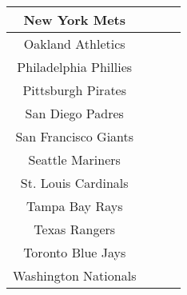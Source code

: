 \documentclass[12pt]{book}
\begin{document}
\begin{center}
\begin{tabular}{|c|c|c|c|}
					\hline
					New York Mets	& & &	\\
					\hline
					Oakland Athletics	& & &	\\
					\hline
					Philadelphia Phillies	& & &	\\
					\hline
					Pittsburgh Pirates	& & &	\\
					\hline
					San Diego Padres	& & &	\\
					\hline
					San Francisco Giants	& & &	\\
					\hline
					Seattle Mariners	& & &	\\
					\hline
					St. Louis Cardinals	& & &	\\
					\hline
					Tampa Bay Rays	& & &	\\
					\hline
					Texas Rangers	& & &	\\
					\hline
					Toronto Blue Jays	& & &	\\
					\hline
					Washington Nationals	& & &	\\
					\hline
					
					
				\end{tabular}
			\end{center}
			
			
			
			
			
			\newpage
\end{document}
